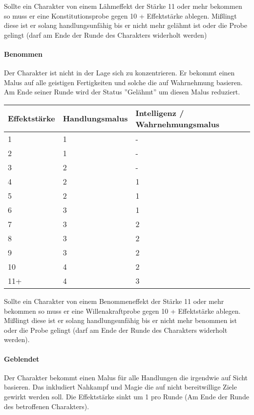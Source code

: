 \documentclass{article}
\begin{document}
Sollte ein Charakter von einem Lähmeffekt der Stärke 11 oder mehr bekommen so muss er eine Konstitutionsprobe gegen
10 + Effektstärke ablegen. Mißlingt diese ist er solang handlungsunfähig bis er nicht mehr gelähmt ist oder die Probe
gelingt (darf am Ende der Runde des Charakters widerholt werden)

\paragraph{Benommen}

Der Charakter ist nicht in der Lage sich zu konzentrieren. Er bekommt einen Malus auf alle geistigen Fertigkeiten und
solche die auf Wahrnehmung basieren. Am Ende seiner Runde wird der Status ''Gelähmt'' um diesen Malus reduziert.


\begin{small}
\begin{tabular}{|m{2cm}|m{3cm}|m{6cm}|}
\hline
\textbf{Effektstärke}&\textbf{Handlungsmalus}&\textbf{Intelligenz / Wahrnehmungsmalus}\\
\hline
\hline
1&1&-\\
\hline
2&1&-\\
\hline
3&2&-\\
\hline
4&2&1\\
\hline
5&2&1\\
\hline
6&3&1\\
\hline
7&3&2\\
\hline
8&3&2\\
\hline
9&3&2\\
\hline
10&4&2&\\
\hline
11+&4&3\\
\hline
\end{tabular}
\end{small}

Sollte ein Charakter von einem Benommeneffekt der Stärke 11 oder mehr bekommen so muss er eine Willenakraftprobe gegen
10 + Effektstärke ablegen. Mißlingt diese ist er solang handlungsunfähig bis er nicht mehr benommen ist oder die Probe
gelingt (darf am Ende der Runde des Charakters widerholt werden).

\paragraph{Geblendet}

Der Charakter bekommt einen Malus für alle Handlungen die irgendwie auf Sicht basieren. Das inkludiert Nahkampf und
Magie die auf nicht bereitwillige Ziele gewirkt werden soll. Die Effektstärke sinkt um 1 pro Runde (Am Ende der Runde
des betroffenen Charakters).
\end{document}
